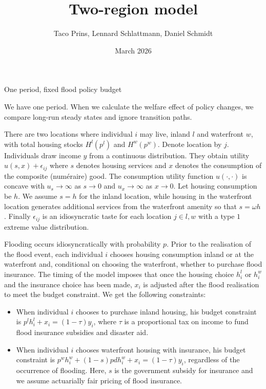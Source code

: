 \documentclass{article}
\title{Two-region model}
\author{Taco Prins, Lennard Schlattmann, Daniel Schmidt}
\date{March 2026}
\begin{document}
\maketitle

\begin{section}{One period, fixed flood policy budget}

We have one period. When we calculate the welfare effect of policy changes, we compare long-run steady states and ignore transition paths. 

\vspace{\baselineskip}

There are two locations where individual $i$ may live, inland $l$ and waterfront $w$, with total housing stocks $H^l(p^l)$ and $H^w(p^w)$. Denote location by $j$. Individuals draw income $y$ from a continuous distribution. They obtain utility $u(s,x)+\epsilon_{ij}$ where $s$ denotes housing services and $x$ denotes the consumption of the composite (numéraire) good. The consumption utility function $u(\cdot,\cdot)$ is concave with $u_s\rightarrow\infty$ as $s\rightarrow0$ and $u_x\rightarrow\infty$ as $x\rightarrow0$. Let housing consumption be $h$. We assume $s=h$ for the inland location, while housing in the waterfront location generates additional services from the waterfront amenity so that $s=\omega h$. Finally $\epsilon_{ij}$ is an idiosyncratic taste for each location $j\in{l,w}$ with a type $1$ extreme value distribution.

\vspace{\baselineskip}

Flooding occurs idiosyncratically with probability $p$. Prior to the realisation of the flood event, each individual $i$ chooses housing consumption inland or at the waterfront and, conditional on choosing the waterfront, whether to purchase flood insurance. The timing of the model imposes that once the housing choice $h^l_i$ or $h^w_i$ and the insurance choice has been made, $x_i$ is adjusted after the flood realisation to meet the budget constraint.  We get the following constraints:

\begin{itemize}

\item When individual $i$ chooses to purchase inland housing, his budget constraint is $p^lh^l_i+x_i=(1-\tau)y_i$, where $\tau$ is a proportional tax on income to fund flood insurance subsidies and disaster aid. 

\item When individual $i$ chooses waterfront housing with insurance, his budget constraint is $p^wh^w_i+(1-s)pdh^w_i+x_i=(1-\tau)y_i$, regardless of the occurrence of flooding. Here, $s$ is the government subsidy for insurance and we assume actuarially fair pricing of flood insurance. 


\end{itemize}
\end{section}
\end{document}
